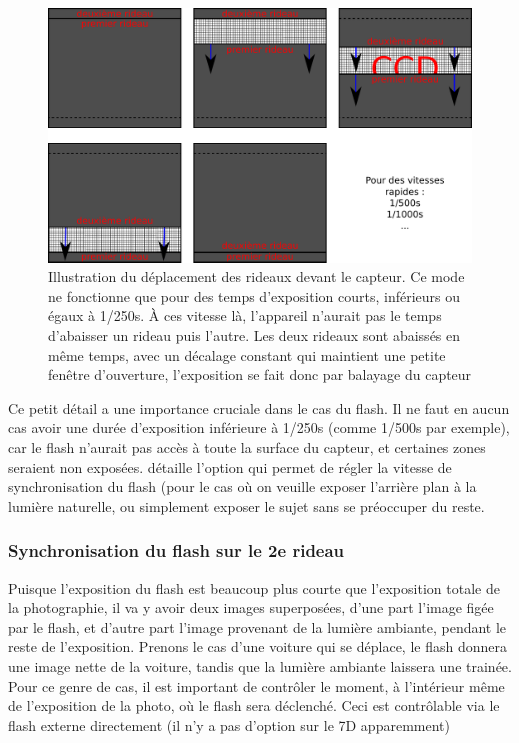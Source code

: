 \documentclass[a4paper,twoside]{article}
\begin{document}
\begin{figure}[htb]
\centering
\includegraphics[width=0.45\linewidth]{figure/first_second_curtain_fast.pdf}
\caption{Illustration du déplacement des rideaux devant le capteur. Ce mode ne fonctionne que pour des temps d'exposition courts, inférieurs ou égaux à 1/250s. À ces vitesse là, l'appareil n'aurait pas le temps d'abaisser un rideau puis l'autre. Les deux rideaux sont abaissés en même temps, avec un décalage constant qui maintient une petite fenêtre d'ouverture, l'exposition se fait donc par balayage du capteur}\label{fig:curtain_slow}
\end{figure}

Ce petit détail a une importance cruciale dans le cas du flash. Il ne faut en aucun cas avoir une durée d'exposition inférieure à 1/250s (comme 1/500s par exemple), car le flash n'aurait pas accès à toute la surface du capteur, et certaines zones seraient non exposées.  détaille l'option qui permet de régler la vitesse de synchronisation du flash (pour le cas où on veuille exposer l'arrière plan à la lumière naturelle, ou simplement exposer le sujet sans se préoccuper du reste.

\subsubsection{Synchronisation du flash sur le 2e rideau}

Puisque l'exposition du flash est beaucoup plus courte que l'exposition totale de la photographie, il va y avoir deux images superposées, d'une part l'image figée par le flash, et d'autre part l'image provenant de la lumière ambiante, pendant le reste de l'exposition. Prenons le cas d'une voiture qui se déplace, le flash donnera une image nette de la voiture, tandis que la lumière ambiante laissera une trainée. Pour ce genre de cas, il est important de contrôler le moment, à l'intérieur même de l'exposition de la photo, où le flash sera déclenché. Ceci est contrôlable via le flash externe directement (il n'y a pas d'option sur le 7D apparemment) %
\end{document}
